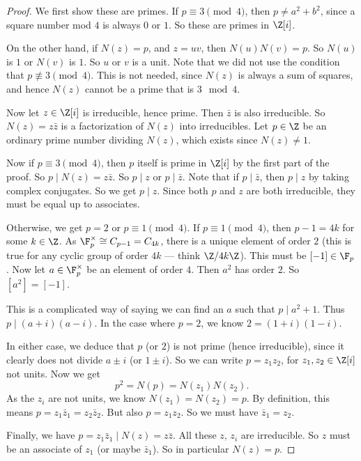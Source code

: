 \documentclass[a4paper]{article}
\begin{document}
\begin{proof}
  We first show these are primes. If $p \equiv 3 \pmod 4$, then $p \not= a^2 + b^2$, since a square number mod $4$ is always $0$ or $1$. So these are primes in $\Z[i]$.

  On the other hand, if $N(z) = p$, and $z = uv$, then $N(u) N(v) = p$. So $N(u)$ is $1$ or $N(v)$ is $1$. So $u$ or $v$ is a unit. Note that we did not use the condition that $p \not\equiv 3 \pmod 4$. This is not needed, since $N(z)$ is always a sum of squares, and hence $N(z)$ cannot be a prime that is $3 \mod 4$.

  Now let $z \in \Z[i]$ is irreducible, hence prime. Then $\bar{z}$ is also irreducible. So $N(z) = z\bar{z}$ is a factorization of $N(z)$ into irreducibles. Let $p \in \Z$ be an ordinary prime number dividing $N(z)$, which exists since $N(z) \not= 1$.

  Now if $p \equiv 3\pmod 4$, then $p$ itself is prime in $\Z[i]$ by the first part of the proof. So $p \mid N(z) = z\bar{z}$. So $p \mid z$ or $p \mid \bar{z}$. Note that if $p \mid \bar{z}$, then $p \mid z$ by taking complex conjugates. So we get $p \mid z$. Since both $p$ and $z$ are both irreducible, they must be equal up to associates.

  Otherwise, we get $p = 2$ or $p \equiv 1 \pmod 4$. If $p \equiv 1 \pmod 4$, then $p - 1 = 4k$ for some $k \in \Z$. As $\F_p^\times \cong C_{p - 1} = C_{4k}$, there is a unique element of order $2$ (this is true for any cyclic group of order $4k$ --- think $\Z/4k\Z$). This must be $[-1] \in \F_p$. Now let $a \in \F_p^\times$ be an element of order $4$. Then $a^2$ has order $2$. So $[a^2] = [-1]$.

  This is a complicated way of saying we can find an $a$ such that $p \mid a^2 + 1$. Thus $p \mid (a + i)(a - i)$. In the case where $p = 2$, we know $2 = (1 + i)(1 - i)$.

  In either case, we deduce that $p$ (or $2$) is not prime (hence irreducible), since it clearly does not divide $a \pm i$ (or $1 \pm i$). So we can write $p = z_1 z_2$, for $z_1, z_2 \in \Z[i]$ not units. Now we get
  \[
    p^2 = N(p) = N(z_1) N(z_2).
  \]
  As the $z_i$ are not units, we know $N(z_1) = N(z_2) = p$. By definition, this means $p = z_1 \bar{z}_1 = z_2 \bar{z}_2$. But also $p = z_1 z_2$. So we must have $\bar{z}_1 = z_2$.

  Finally, we have $p = z_1 \bar{z}_1 \mid N(z) = z\bar{z}$. All these $z$, $z_i$ are irreducible. So $z$ must be an associate of $z_1$ (or maybe $\bar{z}_1$). So in particular $N(z) = p$.
\end{proof}
\end{document}

